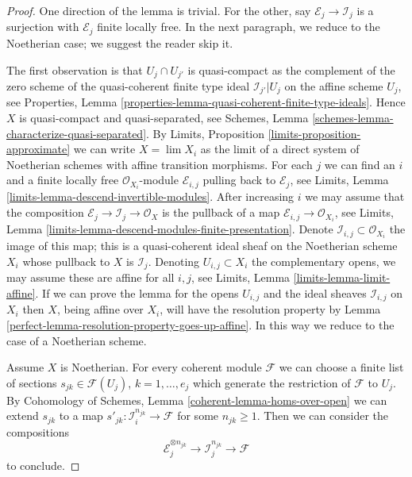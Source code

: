 \begin{proof}

One direction of the lemma is trivial. For the other,
say $\mathcal{E}_j \to \mathcal{I}_j$ is a surjection with
$\mathcal{E}_j$ finite locally free. In the next paragraph, we
reduce to the Noetherian case; we suggest the reader skip it.

\medskip\noindent
The first observation is that $U_j \cap U_{j'}$ is quasi-compact
as the complement of the zero scheme of the quasi-coherent finite type ideal
$\mathcal{I}_{j'}|{U_j}$ on the affine scheme $U_j$, see
Properties, Lemma \ref{properties-lemma-quasi-coherent-finite-type-ideals}.
Hence $X$ is quasi-compact and quasi-separated, see
Schemes, Lemma \ref{schemes-lemma-characterize-quasi-separated}.
By Limits, Proposition \ref{limits-proposition-approximate}
we can write $X = \lim X_i$ as the limit of a direct system of
Noetherian schemes with affine transition morphisms. For each $j$
we can find an $i$ and a finite locally free $\mathcal{O}_{X_i}$-module
$\mathcal{E}_{i, j}$ pulling back to $\mathcal{E}_j$, see
Limits, Lemma \ref{limits-lemma-descend-invertible-modules}.
After increasing $i$ we may assume that the composition
$\mathcal{E}_j \to \mathcal{I}_j \to \mathcal{O}_X$ is the
pullback of a map $\mathcal{E}_{i, j} \to \mathcal{O}_{X_i}$, see
Limits, Lemma \ref{limits-lemma-descend-modules-finite-presentation}.
Denote $\mathcal{I}_{i, j} \subset \mathcal{O}_{X_i}$ the image
of this map; this is a quasi-coherent ideal sheaf on the Noetherian
scheme $X_i$ whose pullback to $X$ is $\mathcal{I}_j$.
Denoting $U_{i, j} \subset X_i$ the complementary opens, we
may assume these are affine for all $i, j$, see
Limits, Lemma \ref{limits-lemma-limit-affine}.
If we can prove the lemma for the opens $U_{i, j}$ and the
ideal sheaves $\mathcal{I}_{i, j}$ on $X_i$ then $X$, being affine
over $X_i$, will have the resolution property by
Lemma \ref{perfect-lemma-resolution-property-goes-up-affine}.
In this way we reduce to the case of a Noetherian scheme.

\medskip\noindent
Assume $X$ is Noetherian. For every coherent module $\mathcal{F}$
we can choose a finite list of sections $s_{jk} \in \mathcal{F}(U_j)$,
$k = 1, \ldots, e_j$ which generate the restriction of $\mathcal{F}$ to $U_j$.
By Cohomology of Schemes, Lemma \ref{coherent-lemma-homs-over-open}
we can extend $s_{jk}$ to a map
$s'_{jk} : \mathcal{I}_i^{n_{jk}} \to \mathcal{F}$ for some $n_{jk} \geq 1$.
Then we can consider the compositions
$$
\mathcal{E}_j^{\otimes n_{jk}} \to \mathcal{I}_j^{n_{jk}} \to \mathcal{F}
$$
to conclude.
\end{proof}

